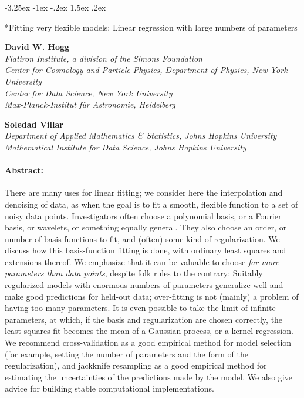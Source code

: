 \documentclass[12pt,letterpaper]{article}
\makeatletter
\renewcommand\section{\@startsection {section}{1}{\z@}%
  {-3.25ex \@plus -1ex \@minus -.2ex}%
  {1.5ex \@plus .2ex}%
  {\raggedright\normalfont\large\bfseries}}
\makeatother
\begin{document}
\thispagestyle{plain}

\section*{Fitting very flexible models: Linear regression with large numbers of parameters}

\noindent
\textbf{David W. Hogg} \\%
\textsl{\footnotesize Flatiron Institute, a division of the Simons Foundation \\
Center for Cosmology and Particle Physics, Department of Physics, New York University \\
Center for Data Science, New York University \\
Max-Planck-Institut f\"ur Astronomie, Heidelberg}

\medskip
\noindent
\textbf{Soledad Villar} \\
\textsl{\footnotesize Department of Applied Mathematics \& Statistics, Johns Hopkins University \\
Mathematical Institute for Data Science, Johns Hopkins University}

\paragraph{Abstract:} There are many uses for linear fitting; we consider here the interpolation and denoising of data, as when the goal is to fit a smooth, flexible function to a set of noisy data points.
Investigators often choose a polynomial basis, or a Fourier basis, or wavelets, or something equally general.
They also choose an order, or number of basis functions to fit, and (often) some kind of regularization.
We discuss how this basis-function fitting is done, with ordinary least squares and extensions thereof.
We emphasize that it can be valuable to choose \emph{far more parameters than data points}, despite folk rules to the contrary:
Suitably regularized models with enormous numbers of parameters generalize well and make good predictions for held-out data; over-fitting is not (mainly) a problem of having too many parameters.
It is even possible to take the limit of infinite parameters, at which, if the basis and regularization are chosen correctly, the least-squares fit becomes the mean of a Gaussian process, or a kernel regression.
We recommend cross-validation as a good empirical method for model selection (for example, setting the number of parameters and the form of the regularization),
and jackknife resampling as a good empirical method for estimating the uncertainties of the predictions made by the model.
We also give advice for building stable computational implementations.
\end{document}
